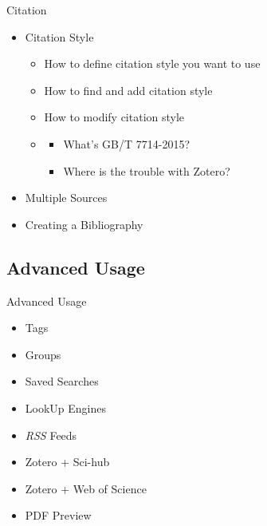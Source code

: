 \documentclass[UTF8]{beamer}
\begin{document}
\begin{frame}{Citation}
\begin{itemize}
\item Citation Style
    \begin{itemize}
    \item How to define citation style you want to use
    \item How to find and add citation style
    \item How to modify citation style \href{https://editor.citationstyles.org/visualEditor/}{\textit{\color{blue}{[Visual CSL Editor]}}}
    \item \textbf{\color{red}{Trouble: GB/T 7714-2015}} 
   	\begin{itemize}
	\item What's GB/T 7714-2015? \href{http://manu49.magtech.com.cn/journalx_gdgyzrb/UserFiles/File/GBT7714-2015.pdf}{\textit{\color{blue}{[GBT 7714-2015.pdf]}}}
	\item Where is the trouble with Zotero?
	\end{itemize}
  \end{itemize}
\item Multiple Sources
\item Creating a Bibliography
\end{itemize}
\end{frame}

\subsection{Advanced Usage}
\begin{frame}{Advanced Usage}
\begin{itemize}
\item Tags
\item Groups
\item Saved Searches
\item LookUp Engines
\item \textit{RSS} Feeds
\item Zotero + Sci-hub
\item Zotero + Web of Science
\item PDF Preview
\end{itemize}
\end{frame}
\end{document}
